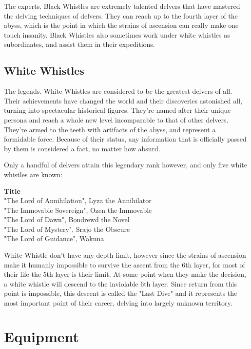 \documentclass[letterpaper,10pt,twoside,twocolumn,openany]{book}
\begin{document}
The experts. Black Whistles are extremely talented delvers that have mastered the delving techniques of delvers. They can reach up to the fourth layer of the abyss, which is the point in which the strains of ascension can really make one touch insanity. Black Whistles also sometimes work under white whistles as subordinates, and assist them in their expeditions. 

\subsection{White Whistles}

The legends. White Whistles are considered to be the greatest delvers of all. Their achievements have changed the world and their discoveries astonished all, turning into spectacular historical figures. They're named after their unique persona and reach a whole new level incomparable to that of other delvers. They're armed to the teeth with artifacts of the abyss, and represent a formidable force. Because of their status, any information that is officially passed by them is considered a fact, no matter how absurd. 

Only a handful of delvers attain this legendary rank however, and only five white whistles are known:

\begin{dndtable}[lX]
  \textbf{Title} \\
  "The Lord of Annihilation", Lyza the Annihilator \\
  "The Immovable Sovereign", Ozen the Immovable \\
  "The Lord of Dawn", Bondrewd the Novel \\
  "The Lord of Mystery", Srajo the Obscure \\
  "The Lord of Guidance", Wakuna \\
\end{dndtable}

White Whistle don't have any depth limit, however since the strains of ascension make it humanly impossible to survive the ascent from the 6th layer, for most of their life the 5th layer is their limit. At some point when they make the decision, a white whistle will descend to the inviolable 6th layer. Since return from this point is impossible, this descent is called the "Last Dive" and it represents the most important point of their career, delving into largely unknown territory.

\section{Equipment}
\end{document}
